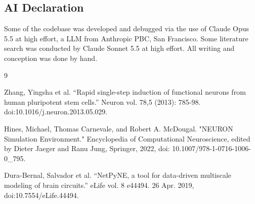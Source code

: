 \documentclass[11pt,a4paper]{article}
\begin{document}
\subsection*{AI Declaration}
Some of the codebase was developed and debugged via the use of Claude Opus 5.5 at high effort, a LLM from Anthropic PBC, San Francisco. Some literature search was conducted by 
Claude Sonnet 5.5 at high effort. All writing and conception was done by hand.


\begin{thebibliography}{9}

Zhang, Yingsha et al. “Rapid single-step induction of functional neurons from human pluripotent stem cells.” Neuron vol. 78,5 (2013): 785-98. doi:10.1016/j.neuron.2013.05.029.

Hines, Michael, Thomas Carnevale, and Robert A. McDougal. "NEURON Simulation Environment." Encyclopedia of Computational Neuroscience, edited by Dieter Jaeger and Ranu Jung, Springer, 2022, doi: 10.1007/978-1-0716-1006-0\_795.

Dura-Bernal, Salvador et al. “NetPyNE, a tool for data-driven multiscale modeling of brain circuits.” eLife vol. 8 e44494. 26 Apr. 2019, doi:10.7554/eLife.44494.

\end{thebibliography}
\end{document}
